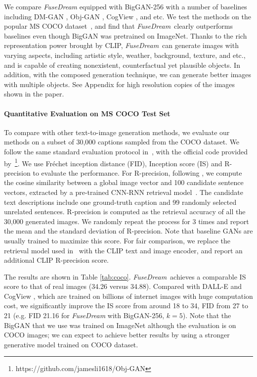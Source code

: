 \documentclass[10pt,twocolumn,letterpaper]{article}
\newcommand{\our}{\emph{FuseDream}}
\begin{document}
We  compare {\our} equipped with BigGAN-256 with a number of baselines including DM-GAN \cite{zhu2019dm}, Obj-GAN \cite{li2019object}, CogView \cite{ding2021cogview}, and etc. 
We test the methods 
on the popular MS COCO dataset~\cite{lin2014microsoft}, and find that \our~clearly outperforms baselines even though BigGAN was pretrained on ImageNet. Thanks to the rich representation power brought by CLIP,  
\our~can generate images 
with varying aspects,   including artistic style, weather, background, texture, and etc., and is  capable of creating nonexistent,  counterfactual yet plausible objects.   
In addition, with the composed generation technique, we can 
generate better images with multiple objects. 
See Appendix for high resolution copies of the images shown in the paper.


\paragraph{Quantitative Evaluation on MS COCO Test Set}
To compare with other text-to-image generation methods, we evaluate our methods on a subset of 30,000 captions sampled from the COCO dataset. We follow the same standard evaluation protocol in~\cite{xu2018attngan, li2019object, tao2020df, zhu2019dm}, with the official code provided by~\cite{li2019object}\footnote{https://github.com/jamesli1618/Obj-GAN}.
We use Fréchet inception distance (FID),  Inception score (IS)
and R-precision to evaluate the performance.
For R-precision, 
following \cite{xu2018attngan, li2019object,zhu2019dm, tao2020df}, we compute the cosine similarity between a global image vector and 100 candidate sentence vectors, extracted by a pre-trained CNN-RNN retrieval model~\cite{xu2018attngan}. The candidate text descriptions include one ground-truth caption and 99 randomly selected unrelated sentences. R-precision is computed as the retrieval accuracy of all the 30,000 generated images.
We randomly repeat the process for 3 times and report the mean and the standard deviation of R-precision.
Note that baseline GANs are usually trained to maximize this score. For fair comparison, 
we replace the retrieval model used in~
\cite{xu2018attngan} with the CLIP text and image encoder, and report an additional CLIP R-precision score.


The results are shown in Table \ref{tab:coco}.
\our~achieves a comparable IS score to that of real images (34.26 versus 34.88).
Compared with DALL-E \cite{ramesh2021zero} and CogView \cite{ding2021cogview}, which are trained on billions of internet images with huge computation cost, 
we significantly improve the IS score from around 18 to 34, FID from 27 to 21 (e.g. FID 21.16 for {\our} with BigGAN-256, $k=5$).
Note that the BigGAN that we use was 
trained on ImageNet although the evaluation is on COCO images; we can expect to achieve better results by using a stronger generative model trained on COCO dataset.
\end{document}
